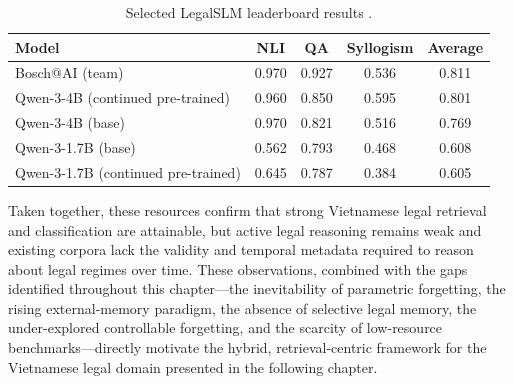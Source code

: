 \begin{table}[H]
\centering
\small
\caption{Selected LegalSLM leaderboard results \parencite{le-etal-2025-overview}.}
\label{tab:legalslm}
\begin{tabularx}{\textwidth}{X c c c c}
\hline
\textbf{Model} & \textbf{NLI} & \textbf{QA} & \textbf{Syllogism} & \textbf{Average} \\
\hline
Bosch@AI (team) & 0.970 & 0.927 & 0.536 & 0.811 \\
Qwen-3-4B (continued pre-trained) & 0.960 & 0.850 & 0.595 & 0.801 \\
Qwen-3-4B (base) & 0.970 & 0.821 & 0.516 & 0.769 \\
Qwen-3-1.7B (base) & 0.562 & 0.793 & 0.468 & 0.608 \\
Qwen-3-1.7B (continued pre-trained) & 0.645 & 0.787 & 0.384 & 0.605 \\
\hline
\end{tabularx}
\end{table}

Taken together, these resources confirm that strong Vietnamese legal retrieval and classification are attainable, but active legal reasoning remains weak and existing corpora lack the validity and temporal metadata required to reason about legal regimes over time. These observations, combined with the gaps identified throughout this chapter---the inevitability of parametric forgetting, the rising external-memory paradigm, the absence of selective legal memory, the under-explored controllable forgetting, and the scarcity of low-resource benchmarks---directly motivate the hybrid, retrieval-centric framework for the Vietnamese legal domain presented in the following chapter.
